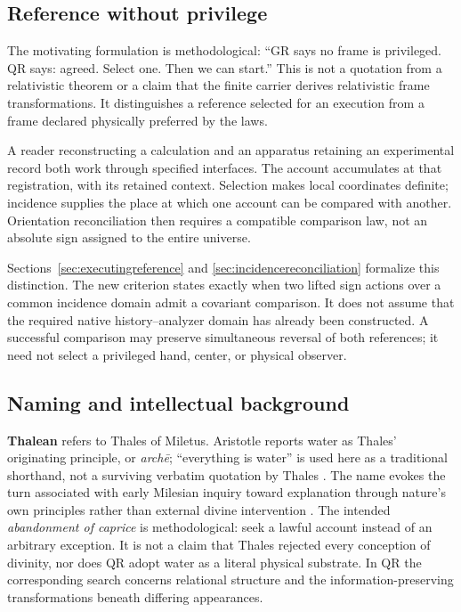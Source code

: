\subsection*{Reference without privilege}
The motivating formulation is methodological: ``GR says no frame is privileged. QR says: agreed. Select one. Then we can start.'' This is not a quotation from a relativistic theorem or a claim that the finite carrier derives relativistic frame transformations. It distinguishes a reference selected for an execution from a frame declared physically preferred by the laws.

A reader reconstructing a calculation and an apparatus retaining an experimental record both work through specified interfaces. The account accumulates at that registration, with its retained context. Selection makes local coordinates definite; incidence supplies the place at which one account can be compared with another. Orientation reconciliation then requires a compatible comparison law, not an absolute sign assigned to the entire universe.

Sections~\ref{sec:executingreference} and \ref{sec:incidencereconciliation} formalize this distinction. The new criterion states exactly when two lifted sign actions over a common incidence domain admit a covariant comparison. It does not assume that the required native history--analyzer domain has already been constructed. A successful comparison may preserve simultaneous reversal of both references; it need not select a privileged hand, center, or physical observer.

\subsection*{Naming and intellectual background}\label{sec:naming}
\textbf{Thalean} refers to Thales of Miletus. Aristotle reports water as Thales' originating principle, or \emph{arch\={e}}; ``everything is water'' is used here as a traditional shorthand, not a surviving verbatim quotation by Thales \citep[Book~I.3, 983b6--27]{aristotleMetaphysics}. The name evokes the turn associated with early Milesian inquiry toward explanation through nature's own principles rather than external divine intervention \citep[Sections~1--2]{curdPresocratics}. The intended \emph{abandonment of caprice} is methodological: seek a lawful account instead of an arbitrary exception. It is not a claim that Thales rejected every conception of divinity, nor does QR adopt water as a literal physical substrate. In QR the corresponding search concerns relational structure and the information-preserving transformations beneath differing appearances.

